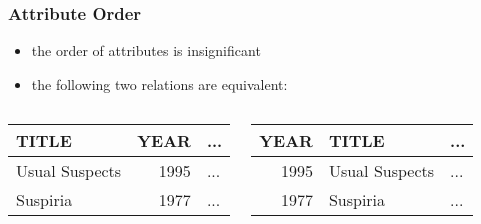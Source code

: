 \documentclass[dvipsnames]{beamer}
\theoremstyle{plain}
\begin{document}
\begin{frame}
  \frametitle{Attribute Order}

  \begin{itemize}
    \item the order of attributes is insignificant
  \end{itemize}

  \begin{example}
    \begin{itemize}
      \item the following two relations are equivalent:
    \end{itemize}

    \begin{columns}
      \begin{footnotesize}
      \begin{table}
        \begin{tabular}{|l|r|l|}\hline
TITLE          & YEAR & ...\\\hline\hline
Usual Suspects & 1995 & ...\\\hline
Suspiria       & 1977 & ...\\\hline
        \end{tabular}
      \end{table}
      \end{footnotesize}

      \begin{footnotesize}
      \begin{table}
        \begin{tabular}{|r|l|l|}\hline
YEAR & TITLE                & ...\\\hline\hline
1995 & Usual Suspects       & ...\\\hline
1977 & Suspiria             & ...\\\hline
        \end{tabular}
      \end{table}
      \end{footnotesize}
    \end{columns}
  \end{example}
\end{frame}
\end{document}
